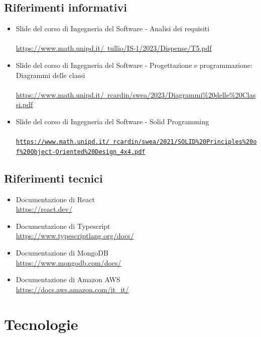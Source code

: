 \documentclass{article}
\begin{document}
{\subsection{Riferimenti informativi}
\begin{itemize}
    \item Slide del corso di Ingegneria del Software - Analisi dei requisiti \\ \\
    \href{https://www.math.unipd.it/~tullio/IS-1/2023/Dispense/T5.pdf}{https://www.math.unipd.it/~tullio/IS-1/2023/Dispense/T5.pdf}
    \item Slide del corso di Ingegneria del Software - Progettazione e programmazione: Diagrammi delle classi \\ \\
\href{https://www.math.unipd.it/~rcardin/swea/2023/Diagrammi%20delle%20Classi.pdf}{https://www.math.unipd.it/~rcardin/swea/2023/Diagrammi\%20delle\%20Classi.pdf}
    \item Slide del corso di Ingegneria del Software - Solid Programming \\ \\
\href{https://www.math.unipd.it/~rcardin/swea/2021/SOLID\%20Principles\%20of\%20Object-Oriented\%20Design_4x4.pdf}{\texttt{https://www.math.unipd.it/~rcardin/swea/2021/SOLID\%20Principles\%20of\%20Object-Oriented\%20Design\_4x4.pdf}}
\end{itemize}
\subsection{Riferimenti tecnici}
\begin{itemize}
\item Documentazione di React \\ \href{ https://react.dev/}{ https://react.dev/}
\item Documentazione di Typescript \\ \href{https://www.typescriptlang.org/docs/}{https://www.typescriptlang.org/docs/}
\item Documentazione di MongoDB \\ \href{https://www.mongodb.com/docs/}{https://www.mongodb.com/docs/}
\item Documentazione di Amazon AWS \\ \href{https://docs.aws.amazon.com/it_it/}{https://docs.aws.amazon.com/it\_it/}
\end{itemize}

\section{Tecnologie}
}
\end{document}
